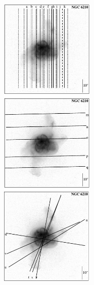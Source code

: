\documentclass[useAMS, usenatbib]{mnras}
\begin{document}
\begin{figure}
\centering
  \includegraphics[width=0.4\textwidth]{Figure2a.pdf}
  \caption{ }
\end{figure}
\end{document}
